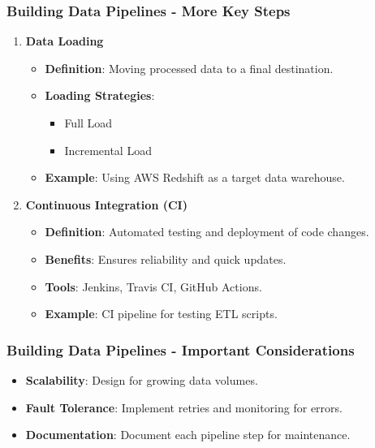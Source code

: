 \documentclass{beamer}
\begin{document}
\begin{frame}[fragile]
    \frametitle{Building Data Pipelines - More Key Steps}
    \begin{enumerate}[resume]
        \item \textbf{Data Loading}
            \begin{itemize}
                \item \textbf{Definition}: Moving processed data to a final destination.
                \item \textbf{Loading Strategies}:
                    \begin{itemize}
                        \item Full Load
                        \item Incremental Load
                    \end{itemize}
                \item \textbf{Example}: Using AWS Redshift as a target data warehouse.
            \end{itemize}
        
        \item \textbf{Continuous Integration (CI)}
            \begin{itemize}
                \item \textbf{Definition}: Automated testing and deployment of code changes.
                \item \textbf{Benefits}: Ensures reliability and quick updates.
                \item \textbf{Tools}: Jenkins, Travis CI, GitHub Actions.
                \item \textbf{Example}: CI pipeline for testing ETL scripts.
            \end{itemize}
    \end{enumerate}
\end{frame}

\begin{frame}[fragile]
    \frametitle{Building Data Pipelines - Important Considerations}
    \begin{itemize}
        \item \textbf{Scalability}: Design for growing data volumes.
        \item \textbf{Fault Tolerance}: Implement retries and monitoring for errors.
        \item \textbf{Documentation}: Document each pipeline step for maintenance.
    \end{itemize}
\end{frame}
\end{document}
